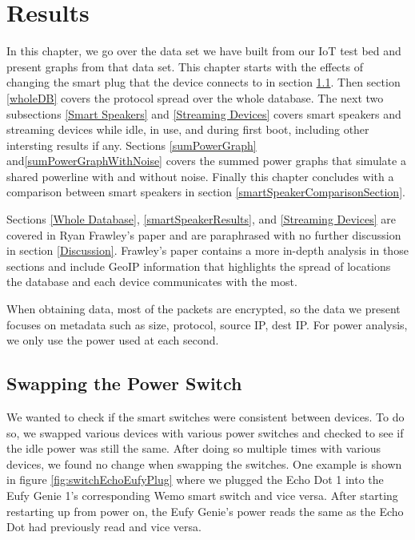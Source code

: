 \chapter{Results}
\label{Results}
In this chapter, we go over the data set we have built from our IoT test bed and present graphs from that data set. This chapter starts with the effects of changing the smart plug that the device connects to in section \ref{swappingSwitch}. Then section \ref{wholeDB} covers the protocol spread over the whole database. The next two subsections \ref{Smart Speakers} and \ref{Streaming Devices} covers smart speakers and streaming devices while idle, in use, and during first boot, including other intersting results if any. Sections \ref{sumPowerGraph} and\ref{sumPowerGraphWithNoise} covers the summed power graphs that simulate a shared powerline with and without noise. Finally this chapter concludes with a comparison between smart speakers in section \ref{smartSpeakerComparisonSection}.

Sections \ref{Whole Database}, \ref{smartSpeakerResults}, and \ref{Streaming Devices} are covered in Ryan Frawley's paper\cite{frawley_2018} and are paraphrased with no further discussion in section \ref{Discussion}. Frawley's paper contains a more in-depth analysis in those sections and include GeoIP information that highlights the spread of locations the database and each device communicates with the most.

When obtaining data, most of the packets are encrypted, so the data we present focuses on metadata such as size, protocol, source IP, dest IP. For power analysis, we only use the power used at each second.

\section{Swapping the Power Switch}
\label{swappingSwitch}
We wanted to check if the smart switches were consistent between devices. To do so, we swapped various devices with various power switches and checked to see if the idle power was still the same. After doing so multiple times with various devices, we found no change when swapping the switches. One example is shown in figure  \ref{fig:switchEchoEufyPlug} where we plugged the Echo Dot 1 into the Eufy
Genie 1's corresponding Wemo smart switch and vice versa. After starting restarting up from power on, the Eufy Genie's power reads the same as the Echo Dot had previously read and vice versa.

